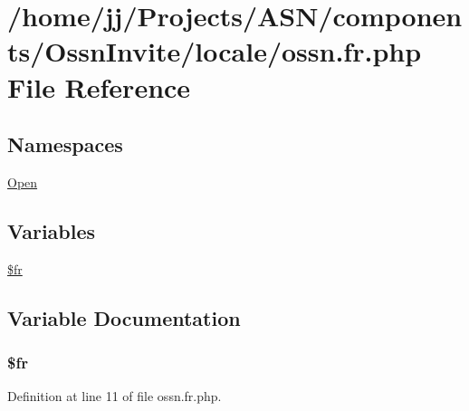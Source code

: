 \hypertarget{components_2_ossn_invite_2locale_2ossn_8fr_8php}{}\section{/home/jj/\+Projects/\+A\+S\+N/components/\+Ossn\+Invite/locale/ossn.fr.\+php File Reference}
\label{components_2_ossn_invite_2locale_2ossn_8fr_8php}
\subsection*{Namespaces}
\begin{DoxyCompactItemize}
\item 
 \hyperlink{namespace_open}{Open}
\end{DoxyCompactItemize}
\subsection*{Variables}
\begin{DoxyCompactItemize}
\item 
\hyperlink{components_2_ossn_invite_2locale_2ossn_8fr_8php_ad5107c697816e7b7f89ad1b3e94e3e0e}{\$fr}
\end{DoxyCompactItemize}


\subsection{Variable Documentation}
\subsubsection[{\texorpdfstring{\$fr}{$fr}}]{\setlength{\rightskip}{0pt plus 5cm}\$fr}\hypertarget{components_2_ossn_invite_2locale_2ossn_8fr_8php_ad5107c697816e7b7f89ad1b3e94e3e0e}{}\label{components_2_ossn_invite_2locale_2ossn_8fr_8php_ad5107c697816e7b7f89ad1b3e94e3e0e}


Definition at line 11 of file ossn.\+fr.\+php.

